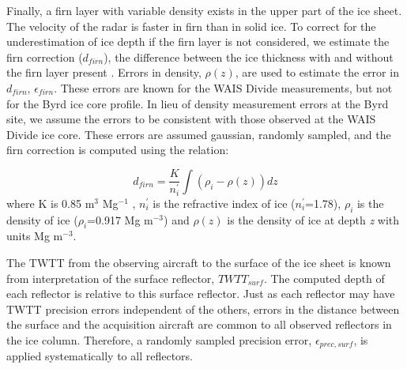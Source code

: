 Finally, a firn layer with variable density \citep{gow1970} exists in the upper part of the ice sheet. The velocity of the radar is faster in firn than in solid ice. To correct for the underestimation of ice depth if the firn layer is not considered, we estimate the firn correction ($d_{firn}$), the difference between the ice thickness with and without the firn layer present . %
Errors in density, $\rho(z)$, are used to estimate the error in $d_{firn}$, $\epsilon_{firn}$. These errors are known for the WAIS Divide measurements, but not for the Byrd ice core profile. In lieu of density measurement errors at the Byrd site, we assume the errors to be consistent with those observed at the WAIS Divide ice core. These errors are assumed gaussian, randomly sampled, and the firn correction is computed using the \citet{dowdeswell2004} relation:

\begin{equation}
d_{firn} = \frac{K}{n^{'}_{i}}\int{(\rho_{i} - \rho(z)) dz}
\end{equation}
where K is 0.85 m$^{3}$ Mg$^{-1}$ \citep{robin1969}, $n^{'}_{i}$ is the refractive index of ice ($n^{'}_{i}$=1.78), $\rho_{i}$ is the density of ice ($\rho_{i}$=0.917 Mg m$^{-3}$) and $\rho(z)$ is the density of ice at depth \textit{z} with units Mg m$^{-3}$.

The TWTT from the observing aircraft to the surface of the ice sheet is known from interpretation of the surface reflector, $TWTT_{surf}$. The computed depth of each reflector is relative to this surface reflector. Just as each reflector may have TWTT precision errors independent of the others, errors in the distance between the surface and the acquisition aircraft are common to all observed reflectors in the ice column. Therefore, a randomly sampled precision error, $\epsilon_{prec,surf}$, is applied systematically to all reflectors.







